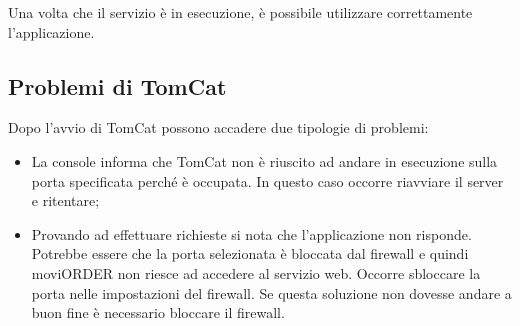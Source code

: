 		Una volta che il servizio è in esecuzione, è possibile utilizzare correttamente l'applicazione.
		
	\subsection{Problemi di TomCat}
	
		Dopo l'avvio di TomCat possono accadere due tipologie di problemi: 
			\begin{itemize}
				\item La console informa che TomCat non è riuscito ad andare in esecuzione sulla porta specificata perché è occupata. In questo caso occorre riavviare il server e ritentare;
				\item Provando ad effettuare richieste si nota che l'applicazione non risponde. Potrebbe essere che la porta selezionata è bloccata dal firewall e quindi moviORDER non riesce ad accedere al servizio web. Occorre sbloccare la porta nelle impostazioni del firewall. Se questa soluzione non dovesse andare a buon fine è necessario bloccare il firewall. 
			\end{itemize}